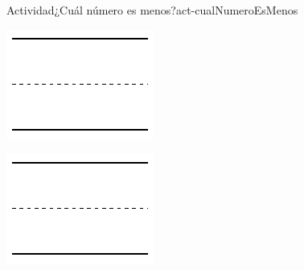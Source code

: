 \documentclass[20pt]{extarticle}
\begin{document}
\begin{activity}{Actividad}{¿Cuál número es menos?}{act-cualNumeroEsMenos}
\begin{sidebyside}{2}{0.1}{0.1}{0.2}
\begin{sbspanel}{0.3}
\includegraphics[max width=\linewidth, center]{external/svg-source/tikz-file-148545.pdf}
\end{sbspanel}%
\begin{sbspanel}{0.3}%
\includegraphics[max width=\linewidth, center]{external/svg-source/tikz-file-148545.pdf}
\end{sbspanel}%
\end{sidebyside}%

\clearpage



\end{activity}
\end{document}
